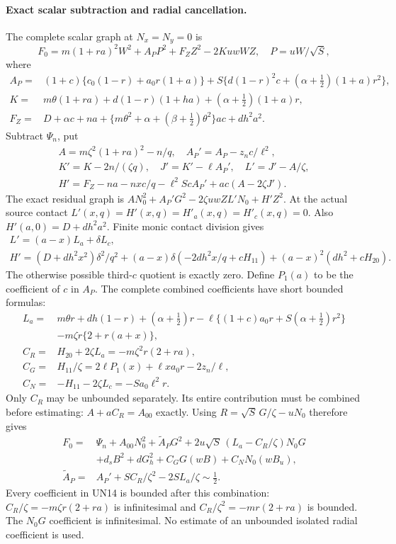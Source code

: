 \paragraph{Exact scalar subtraction and radial cancellation.}
The complete scalar graph at $N_x=N_y=0$ is
\[
 F_0=m(1+ra)^2W^2+A_PP^2+F_ZZ^2-2KuwWZ,
 \quad P=uW/\sqrt S,
 \tag{UN9}
\]
where
\[
\begin{split}
 A_P={}&(1+c)\{c_0(1-r)+a_0r(1+a)\}
       +S\{d(1-r)^2c+(\alpha+\tfrac12)(1+a)r^2\},\\
 K={}&m\theta(1+ra)+d(1-r)(1+ha)
                         +(\alpha+\tfrac12)(1+a)r,\\
 F_Z={}&D+\alpha c+na+
          \{m\theta^2+\alpha+(\beta+\tfrac12)\theta^2\}ac
                                                 +dh^2a^2.
\end{split}\tag{UN10}
\]
Subtract $\Psi_n$, put
\[
\begin{gathered}
 A=m\zeta^2(1+ra)^2-n/q,\quad A_P'=A_P-z_nc/\ell^2,\\
 K'=K-2n/(\zeta q),\quad J'=K'-\ell A_P',\quad
 L'=J'-A/\zeta,\\
 H'=F_Z-na-nxc/q-\ell^2ScA_P'+ac(A-2\zeta J').
\end{gathered}\tag{UN11}
\]
The exact residual graph is $A N_0^2+A_P'G^2-
2\zeta uwZL'N_0+H'Z^2$. At the actual source contact
$L'(x,q)=H'(x,q)=H'_a(x,q)=H'_c(x,q)=0$.
Also $H'(a,0)=D+dh^2a^2$. Finite monic contact division gives
\[
\begin{gathered}
 L'=(a-x)L_a+\delta L_c,\\
 H'=(D+dh^2x^2)\delta^2/q^2
       +(a-x)\delta(-2dh^2x/q+cH_{11})
       +(a-x)^2(dh^2+cH_{20}).
\end{gathered}\tag{UN12}
\]
The otherwise possible third-$c$ quotient is exactly zero.
Define $P_1(a)$ to be the coefficient of $c$ in $A_P$. The complete
combined coefficients have short bounded formulas:
\[
\begin{split}
 L_a={}&m\theta r+dh(1-r)+(\alpha+\tfrac12)r
       -\ell\{(1+c)a_0r+S(\alpha+\tfrac12)r^2\}\\
       &-m\zeta r\{2+r(a+x)\},\\
 C_R={}&H_{20}+2\zeta L_a=-m\zeta^2r(2+ra),\\
 C_G={}&H_{11}/\zeta=2\ell P_1(x)+\ell x a_0r-2z_n/\ell,\\
 C_N={}&-H_{11}-2\zeta L_c=-Sa_0\ell^2r.
\end{split}\tag{UN13}
\]
Only $C_R$ may be unbounded separately. Its entire contribution
must be combined before estimating: $A+aC_R=A_{00}$ exactly.
Using $R=\sqrt S\,G/\zeta-uN_0$ therefore gives
\[
\begin{split}
 F_0={}&\Psi_n+A_{00}N_0^2+\widetilde A_PG^2
             +2u\sqrt S\,(L_a-C_R/\zeta)N_0G\\
 &+d_sB^2+dG_h^2+C_GG(wB)+C_NN_0(wB_u),\\
 \widetilde A_P={}&A_P'+SC_R/\zeta^2-2SL_a/\zeta\sim\tfrac12.
\end{split}\tag{UN14}
\]
Every coefficient in UN14 is bounded after this combination:
$C_R/\zeta=-m\zeta r(2+ra)$ is infinitesimal and
$C_R/\zeta^2=-mr(2+ra)$ is bounded. The $N_0G$ coefficient
is infinitesimal. No estimate of an unbounded isolated radial
coefficient is used.

